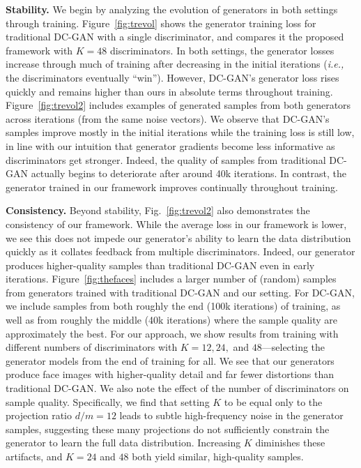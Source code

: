 \documentclass{article}
\begin{document}
\textbf{Stability.} We begin by analyzing the evolution of generators in both settings through training. Figure~\ref{fig:trevol} shows the generator training loss for traditional DC-GAN with a single discriminator, and compares it the proposed framework with $K=48$ discriminators. In both settings, the generator losses increase through much of training after decreasing in the initial iterations (\emph{i.e.,} the discriminators eventually ``win''). However, DC-GAN's generator loss rises quickly and remains higher than ours in absolute terms throughout training. Figure~\ref{fig:trevol2} includes examples of generated samples from both generators across iterations (from the same noise vectors). We observe that DC-GAN's samples improve mostly in the initial iterations while the training loss is still low, in line with our intuition that generator gradients become less informative as discriminators get stronger. Indeed, the quality of samples from traditional DC-GAN actually begins to deteriorate after around 40k iterations. In contrast, the generator trained in our framework improves continually  throughout training.

\textbf{Consistency.} Beyond stability, Fig.~\ref{fig:trevol2} also demonstrates the consistency of our framework. While the average loss in our framework is lower, we see this does not impede our generator's ability to learn the data distribution quickly as it collates feedback from multiple discriminators. Indeed, our generator produces higher-quality samples than traditional DC-GAN even in early iterations. Figure~\ref{fig:thefaces} includes a larger number of (random) samples from generators trained with traditional DC-GAN and our setting. For DC-GAN, we include samples from both roughly the end (100k iterations) of training, as well as from roughly the middle (40k iterations) where the sample quality are approximately the best. For our approach, we show results from training with different numbers of discriminators with $K=12, 24,$ and $48$---selecting the generator models from the end of training for all. We see that our generators produce face images with higher-quality detail and far fewer distortions than traditional DC-GAN. We also note the effect of the number of discriminators on sample quality. Specifically, we find that setting $K$ to be equal only to the projection ratio $d/m=12$ leads to subtle high-frequency noise in the generator samples, suggesting these many projections do not sufficiently constrain the generator to learn the full data distribution. Increasing $K$ diminishes these artifacts, and $K=24$ and $48$ both yield similar, high-quality samples.
\end{document}

